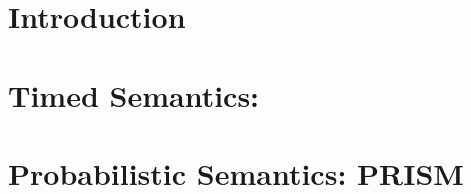 
\chapter{Introduction}\label{cha:semantics-intro}


\chapter{Timed Semantics: \tockcsp}\label{cha:semantics-tockcsp}


\chapter{Probabilistic Semantics: PRISM}\label{cha:semantics-prism}
%

